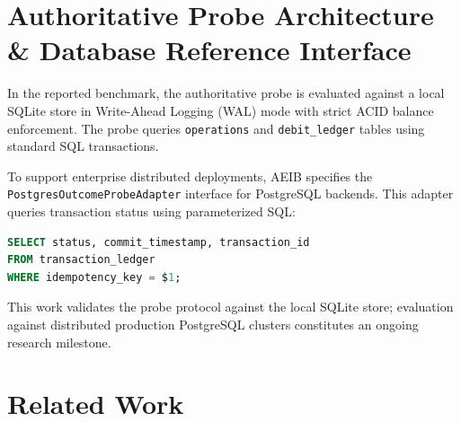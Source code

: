 \documentclass[10pt,journal,compsoc]{IEEEtran}
\begin{document}
\section{Authoritative Probe Architecture \& Database Reference Interface}

In the reported benchmark, the authoritative probe is evaluated against a local SQLite store in Write-Ahead Logging (WAL) mode with strict ACID balance enforcement. The probe queries \texttt{operations} and \texttt{debit\_ledger} tables using standard SQL transactions.

To support enterprise distributed deployments, AEIB specifies the \texttt{PostgresOutcomeProbeAdapter} interface for PostgreSQL backends. This adapter queries transaction status using parameterized SQL:
\begin{lstlisting}[language=SQL]
SELECT status, commit_timestamp, transaction_id 
FROM transaction_ledger 
WHERE idempotency_key = $1;
\end{lstlisting}
This work validates the probe protocol against the local SQLite store; evaluation against distributed production PostgreSQL clusters constitutes an ongoing research milestone.

\section{Related Work}
\end{document}
